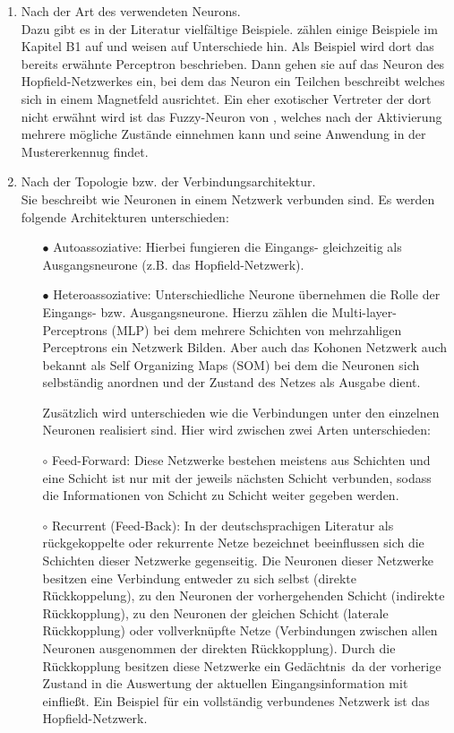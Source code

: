 \begin{enumerate}
\item%
Nach der Art des verwendeten Neurons.\\
Dazu gibt es in der Literatur vielfältige Beispiele. \citet{Fiesler96} zählen einige Beispiele im Kapitel B1 auf und weisen auf Unterschiede hin. Als Beispiel wird dort das bereits erwähnte Perceptron beschrieben. Dann gehen sie auf das Neuron des Hopfield-Netzwerkes ein, bei dem das Neuron ein Teilchen beschreibt welches sich in einem Magnetfeld ausrichtet. Ein eher exotischer Vertreter der dort nicht erwähnt wird ist das Fuzzy-Neuron von \citet{fuzzy-neuron}, welches nach der Aktivierung mehrere mögliche Zustände einnehmen kann und seine Anwendung in der Mustererkennug findet.

\item%
Nach der Topologie bzw. der Verbindungsarchitektur.\\
Sie beschreibt wie Neuronen in einem Netzwerk verbunden sind.
Es werden folgende Architekturen unterschieden:
\begin{itemize}
\item[\textbf{$\bullet$}]%
Autoassoziative: Hierbei fungieren die Eingangs- gleichzeitig als Ausgangsneurone (z.B. das Hopfield-Netzwerk). 

\item[\textbf{$\bullet$}]%
Heteroassoziative: Unterschiedliche Neurone übernehmen die Rolle der Eingangs- bzw. Ausgangsneurone. Hierzu zählen die Multi-layer-Perceptrons (MLP) bei dem mehrere Schichten von mehrzahligen Perceptrons ein Netzwerk Bilden. Aber auch das Kohonen Netzwerk auch bekannt als Self Organizing Maps (SOM) bei dem die Neuronen sich selbständig anordnen und der Zustand des Netzes als Ausgabe dient.

Zusätzlich wird unterschieden wie die Verbindungen unter den einzelnen Neuronen realisiert sind. Hier wird zwischen zwei Arten unterschieden:

\item[$\circ$]%
Feed-Forward: Diese Netzwerke bestehen meistens aus Schichten und eine Schicht ist nur mit der jeweils nächsten Schicht verbunden, sodass die Informationen von Schicht zu Schicht weiter gegeben werden.

\item[$\circ$]%
Recurrent (Feed-Back): In der deutschsprachigen Literatur als rückgekoppelte oder rekurrente Netze bezeichnet beeinflussen sich die Schichten dieser Netzwerke gegenseitig. Die Neuronen dieser Netzwerke besitzen eine Verbindung entweder zu sich selbst (direkte Rückkoppelung), zu den Neuronen der vorhergehenden Schicht (indirekte Rückkopplung), zu den Neuronen der gleichen Schicht (laterale Rückkopplung) oder vollverknüpfte Netze (Verbindungen zwischen allen Neuronen ausgenommen der direkten Rückkopplung). Durch die Rückkopplung besitzen diese Netzwerke ein \glqq Gedächtnis\grqq~da der vorherige Zustand in die Auswertung der aktuellen Eingangsinformation mit einfließt. Ein Beispiel für ein vollständig verbundenes Netzwerk ist das Hopfield-Netzwerk.


\end{itemize}
\end{enumerate}

